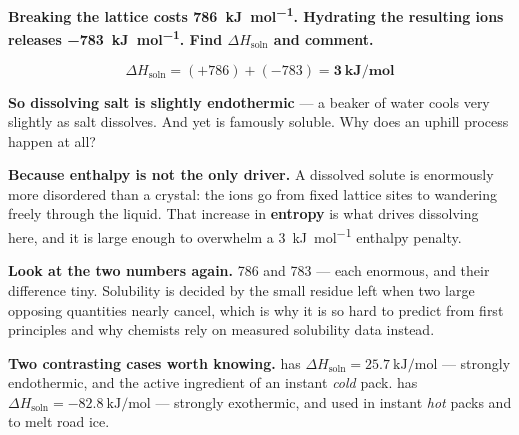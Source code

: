 \documentclass{apchem-worksheet}
\begin{document}
\begin{workedexample}
\textbf{Breaking the  lattice costs
\SI{+786}{\kilo\joule\per\mole}. Hydrating the resulting ions releases
\SI{-783}{\kilo\joule\per\mole}. Find $\Delta H_{\text{soln}}$ and
comment.}

\[ \Delta H_{\text{soln}} = (+786) + (-783)
   = \mathbf{\SI{+3}{\kilo\joule\per\mole}} \]

\textbf{So dissolving salt is slightly endothermic} --- a beaker of
water cools very slightly as salt dissolves. And yet  is
famously soluble. Why does an uphill process happen at all?

\textbf{Because enthalpy is not the only driver.} A dissolved solute is
enormously more disordered than a crystal: the ions go from fixed
lattice sites to wandering freely through the liquid. That increase in
\textbf{entropy} is what drives dissolving here, and it is large enough
to overwhelm a \SI{3}{\kilo\joule\per\mole} enthalpy penalty.

\textbf{Look at the two numbers again.} \SI{786}{} and \SI{783}{} ---
each enormous, and their difference tiny. Solubility is decided by the
small residue left when two large opposing quantities nearly cancel,
which is why it is so hard to predict from first principles and why
chemists rely on measured solubility data instead.

\textbf{Two contrasting cases worth knowing.}
 has $\Delta H_{\text{soln}} =
\SI{+25.7}{\kilo\joule\per\mole}$ --- strongly endothermic, and the
active ingredient of an instant \emph{cold} pack.
 has $\Delta H_{\text{soln}} =
\SI{-82.8}{\kilo\joule\per\mole}$ --- strongly exothermic, and used in
instant \emph{hot} packs and to melt road ice.
\end{workedexample}
\end{document}
